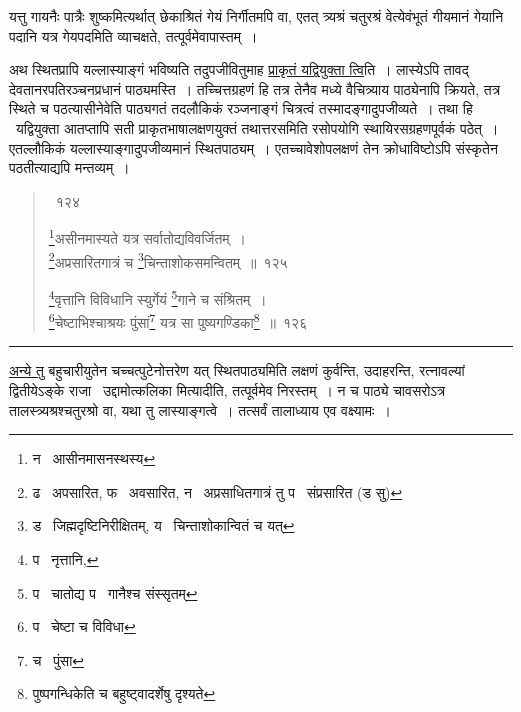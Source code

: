 \documentclass[11pt, openany]{book}
\begin{document}
यत्तु गायनैः पात्रैः शुष्कमित्यर्थात् छेकाश्रितं गेयं निर्गीतमपि वा, एतत् त्र्यश्रं चतुरश्रं वेत्येवंभूतं गीयमानं गेयानि पदानि यत्र गेयपदमिति व्याचक्षते, तत्पूर्वमेवापास्तम्~।\\

\begin{sloppypar}
अथ स्थितप्रापि यल्लास्याङ्गं भविष्यति तदुपजीवितुमाह \underline{प्राकृतं यद्वियुक्ता त्वि}ति~। लास्येऽपि तावद् देवतानरपतिरञ्चनप्रधानं पाठ्यमस्ति~। तच्चित्तग्रहणं हि तत्र तेनैव मध्ये वैचित्र्याय पाठ्येनापि क्रियते, तत्र स्थिते च पठत्यासीनेवेति पाठ्यगतं तदलौकिकं रञ्जनाङ्गं चित्रत्वं तस्मादङ्गादुपजीव्यते~। तथा हि \textendash\ यद्वियुक्ता आतप्तापि सती प्राकृतभाषालक्षणयुक्तं तथात्तरसमिति रसोपयोगि स्थायिरसग्रहणपूर्वकं पठेत्~। एतल्लौकिकं यल्लास्याङ्गादुपजीव्यमानं स्थितपाठ्यम्~। एतच्चावेशोपलक्षणं तेन क्रोधाविष्टोऽपि संस्कृतेन पठतीत्याद्यपि मन्तव्यम्~।
\end{sloppypar}

\newpage

\begin{quote}
{~१२४

\renewcommand{\thefootnote}{2}\footnote{न \textendash\ आसीनमासनस्थस्य}असीनमास्यते यत्र सर्वातोद्यविवर्जितम्~।\\
\renewcommand{\thefootnote}{3}\footnote{ढ \textendash\ अपसारित, फ \textendash\ अवसारित, न \textendash\ अप्रसाधितगात्रं तु प \textendash\ संप्रसारित (ड सु)}अप्रसारितगात्रं च \renewcommand{\thefootnote}{4}\footnote{ड \textendash\ जिह्मदृष्टिनिरीक्षितम्, य \textendash\ चिन्ताशोकान्वितं च यत्}चिन्ताशोकसमन्वितम्~॥~१२५

\renewcommand{\thefootnote}{5}\footnote{प \textendash\ नृत्तानि,}वृत्तानि विविधानि स्युर्गेयं \renewcommand{\thefootnote}{6}\footnote{प \textendash\ चातोद्य प \textendash\ गानैश्च संस्सृतम्}गाने च संश्रितम्~।\\
\renewcommand{\thefootnote}{7}\footnote{प \textendash\ चेष्टा च विविधा}चेष्टाभिश्चाश्रयः पुंसां\renewcommand{\thefootnote}{8}\footnote{च \textendash\ पुंसा} यत्र सा पुष्यगण्डिका\renewcommand{\thefootnote}{9}\footnote{पुष्पगन्धिकेति च बहुष्ट्वादर्शेषु दृश्यते}~॥~१२६}
\end{quote}

\hrule

\vspace{2mm}
\underline{अन्ये तु} बहुचारीयुतेन चच्चत्पुटेनोत्तरेण यत् स्थितपाठ्यमिति लक्षणं कुर्वन्ति, उदाहरन्ति, रत्नावल्यां द्वितीयेऽङ्के राजा \textendash\ {\qt उद्दामोत्कलिका} मित्यादीति, तत्पूर्वमेव निरस्तम्~। न च पाठ्ये चावसरोऽत्र तालस्त्र्यश्रश्चतुरश्रो वा, यथा तु लास्याङ्गत्वे~। तत्सर्वं तालाध्याय एव वक्ष्यामः~।\\
\end{document}
